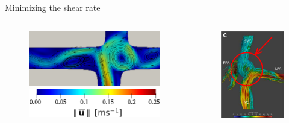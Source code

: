 \documentclass[aspectratio=169,xcolor=dvipsnames]{beamer}
\begin{document}
\begin{frame}{Minimizing the shear rate}
	\addtocounter{framenumber}{-1}
	\begin{columns}
		\begin{column}{.65\textwidth}
			\begin{figure}
				\vspace{2mm}
				\includegraphics[width=1.0\linewidth, trim={0 0 1cm 9mm}, clip]{Images/tcpc_dotgamma_veloc_a_streamlines.png}
				\\[7pt]
				\includegraphics[width=0.37	\textwidth]{Images/tcpc_dotgamma_veloc_legenda.png}
			\end{figure}
		\end{column}
		\begin{column}{.35\textwidth}
			\begin{figure}
				\renewcommand{\figurename}{Fontan circulation}
				\includegraphics[width=0.75\linewidth, trim={0 0 0 0mm}, clip]{Images/vortex.png}

\end{figure}
\end{column}
\end{columns}
\end{frame}
\end{document}
